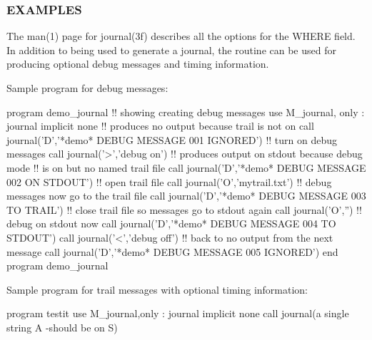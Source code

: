 \subsubsection*{E\+X\+A\+M\+P\+L\+ES}

\begin{DoxyVerb}The man(1) page for journal(3f) describes all the options for the WHERE field.
In addition to being used to generate a journal, the routine can be used for
producing optional debug messages and timing information.

Sample program for debug messages:

  program demo_journal
  !! showing creating debug messages
  use M_journal, only : journal
  implicit none
  !! produces no output because trail is not on
  call journal('D','*demo* DEBUG MESSAGE 001 IGNORED')
  !! turn on debug messages
  call journal('>','debug on')
  !! produces output on stdout because debug mode
  !! is on but no named trail file
  call journal('D','*demo* DEBUG MESSAGE 002 ON STDOUT')
  !! open trail file
  call journal('O','mytrail.txt')
  !! debug messages now go to the trail file
  call journal('D','*demo* DEBUG MESSAGE 003 TO TRAIL')
  !! close trail file so messages go to stdout again
  call journal('O','')
  !! debug on stdout now
  call journal('D','*demo* DEBUG MESSAGE 004 TO STDOUT')
  call journal('<','debug off')
  !! back to no output from the next message
  call journal('D','*demo* DEBUG MESSAGE 005 IGNORED')
  end program demo_journal
\end{DoxyVerb}


Sample program for trail messages with optional timing information\+:

program testit use M\+\_\+journal,only \+: journal implicit none call journal(\textquotesingle{}a single string A -\/should be on S\textquotesingle{})


